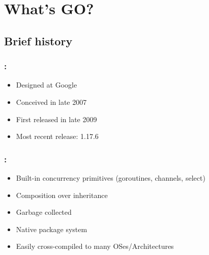 \section{What's GO?}

\subsection{Brief history}

\begin{frame}
    \frametitle{\secname: \small\subsecname\normalsize}

    \begin{itemize}
        \item Designed at Google
        \item Conceived in late 2007
        \item First released in late 2009
        \item Most recent release: 1.17.6
    \end{itemize}

\end{frame}

\begin{frame}
    \frametitle{\secname: \small\subsecname\normalsize}

    \begin{itemize}
        \item Built-in concurrency primitives (goroutines, channels, select)
        \item Composition over inheritance
        \item Garbage collected
        \item Native package system
        \item Easily cross-compiled to many OSes/Architectures
    \end{itemize}

\end{frame}
